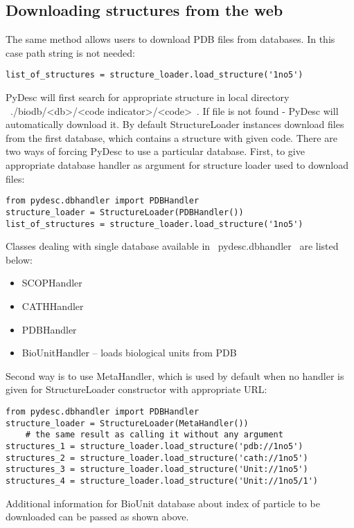 \documentclass[a4paper,10pt]{article}
\begin{document}
\subsection{Downloading structures from the web}

The same method allows users to download PDB files from databases. In this case path string is not needed:
\begin{lstlisting}
list_of_structures = structure_loader.load_structure('1no5')
\end{lstlisting}
PyDesc will first search for appropriate structure in local directory ~./biodb/<db>/<code indicator>/<code>~. If file is not found - PyDesc will automatically download it. By default StructureLoader instances download files from the first database, which contains a structure with given code. There are two ways of forcing PyDesc to use a particular database. First, to give appropriate database handler as argument for structure loader used to download files:
\begin{lstlisting}
from pydesc.dbhandler import PDBHandler
structure_loader = StructureLoader(PDBHandler())
list_of_structures = structure_loader.load_structure('1no5')
\end{lstlisting}
Classes dealing with single database available in ~pydesc.dbhandler~ are listed below:
\begin{itemize}
\item SCOPHandler
\item CATHHandler
\item PDBHandler
\item BioUnitHandler -- loads biological units from PDB
\end{itemize}

Second way is to use MetaHandler, which is used by default when no handler is given for StructureLoader constructor with appropriate URL:
\begin{lstlisting} 
from pydesc.dbhandler import PDBHandler
structure_loader = StructureLoader(MetaHandler())
	# the same result as calling it without any argument
structures_1 = structure_loader.load_structure('pdb://1no5')
structures_2 = structure_loader.load_structure('cath://1no5')
structures_3 = structure_loader.load_structure('Unit://1no5')
structures_4 = structure_loader.load_structure('Unit://1no5/1')
\end{lstlisting}
Additional information for BioUnit database about index of particle to be downloaded can be passed as shown above.
\end{document}
